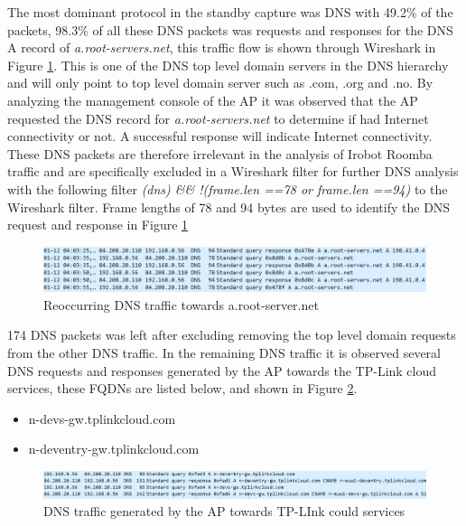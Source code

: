 The most dominant protocol in the standby capture was DNS with 49.2\% of the packets, 98.3\% of all these DNS packets was requests and responses for the DNS A record of \textit{a.root-servers.net}, this traffic flow is shown through Wireshark in Figure \ref{fig:dns_a-root}. This is one of the DNS top level domain servers in the DNS hierarchy and will only point to top level domain server such as .com, .org and .no. By analyzing the management console of the AP it was observed that the AP requested the DNS record for \textit{a.root-servers.net} to determine if had Internet connectivity or not. A successful response will indicate Internet connectivity. These DNS packets are therefore irrelevant in the analysis of Irobot Roomba traffic and are specifically excluded in a Wireshark filter for further DNS analysis with the following filter  \textit{(dns) \&\& !(frame.len ==78 or frame.len ==94)} to the Wireshark filter. Frame lengths of 78 and 94 bytes are used to identify the DNS request and response in Figure  \ref{fig:dns_a-root}

\begin{figure}[H]
    \centering
    \includegraphics[width=\textwidth]{figures/DNS_a-root.png}
    \caption{Reoccurring DNS traffic towards a.root-server.net}
    \label{fig:dns_a-root}
\end{figure}

174 DNS packets was left after excluding removing the top level domain requests from the other DNS traffic. In the remaining DNS traffic it is observed several DNS requests and responses generated by the AP towards the TP-Link cloud services, these FQDNs are listed below, and shown in Figure \ref{fig:tp-link_fqdn}. 

\begin{itemize}
    \item n-devs-gw.tplinkcloud.com
    \item n-deventry-gw.tplinkcloud.com
\end{itemize}

\begin{figure}[H]
    \centering
    \includegraphics[width=\textwidth]{figures/DNS-tp-link.png}
    \caption{DNS traffic generated by the AP towards TP-LInk could services}
    \label{fig:tp-link_fqdn}
\end{figure}

